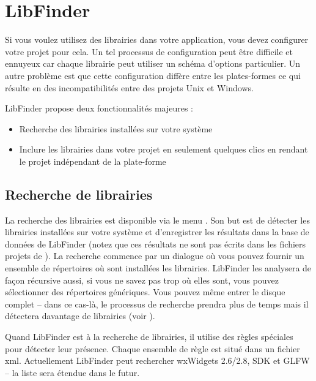 \section{LibFinder}\label{sec:lib_finder}

Si vous voulez utilisez des librairies dans votre application, vous devez configurer votre projet pour cela. Un tel processus de configuration peut être difficile et ennuyeux car chaque librairie peut utiliser un schéma d'options particulier. Un autre problème est que cette configuration diffère entre les plates-formes ce qui résulte en des incompatibilités entre des projets Unix et Windows.

LibFinder propose deux fonctionnalités majeures :

\begin{itemize}
\item Recherche des librairies installées sur votre système
\item Inclure les librairies dans votre projet en seulement quelques clics en rendant le projet indépendant de la plate-forme
\end{itemize}

\subsection{Recherche de librairies}

La recherche des librairies est disponible via le menu . Son but est de détecter les librairies installées sur votre système et d'enregistrer les résultats dans la base de données de LibFinder (notez que ces résultats ne sont pas écrits dans les fichiers projets de \codeblocks). La recherche commence par un dialogue où vous pouvez fournir un ensemble de répertoires où sont installées les librairies. LibFinder les analysera de façon récursive aussi, si vous ne savez pas trop où elles sont, vous pouvez sélectionner des répertoires génériques. Vous pouvez même entrer le disque complet -- dans ce cas-là, le processus de recherche prendra plus de temps mais il détectera davantage de librairies (voir ).


Quand LibFinder est à la recherche de librairies, il utilise des règles spéciales pour détecter leur présence. Chaque ensemble de règle est situé dans un fichier xml. Actuellement LibFinder peut rechercher wxWidgets 2.6/2.8, \codeblocks SDK et GLFW -- la liste sera étendue dans le futur.

